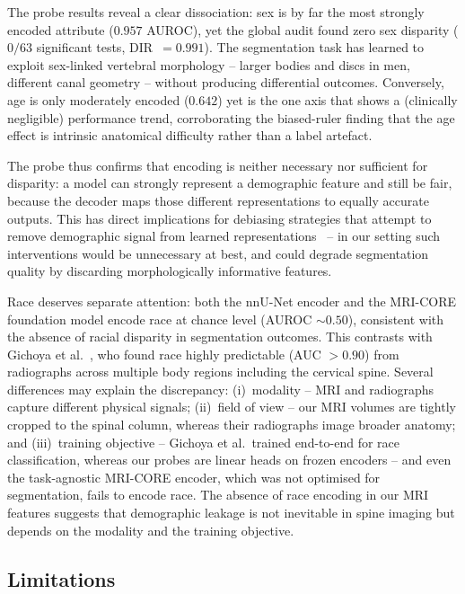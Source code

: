 The probe results reveal a clear dissociation: sex is by far the most strongly
encoded attribute ($0.957$ AUROC), yet the global audit found zero sex disparity
($0/63$ significant tests, DIR~$= 0.991$). The segmentation task has learned to
exploit sex-linked vertebral morphology -- larger bodies and discs in men,
different canal geometry -- without producing differential outcomes. Conversely,
age is only moderately encoded ($0.642$) yet is the one axis that shows a
(clinically negligible) performance trend, corroborating the biased-ruler finding
that the age effect is intrinsic anatomical difficulty rather than a label
artefact.

The probe thus confirms that encoding is neither necessary nor sufficient for
disparity: a model can strongly represent a demographic feature and still be fair,
because the decoder maps those different representations to equally accurate
outputs. This has direct implications for debiasing strategies that attempt to
remove demographic signal from learned representations~\cite{petersen2023feature}
-- in our setting such interventions would be unnecessary at best, and could
degrade segmentation quality by discarding morphologically informative features.

Race deserves separate attention: both the nnU-Net encoder and the MRI-CORE
foundation model encode race at chance level (AUROC ${\sim}0.50$), consistent
with the absence of racial disparity in segmentation outcomes. This contrasts
with Gichoya et al.~\cite{gichoya2022reading}, who found race highly predictable
(AUC $>0.90$) from radiographs across multiple body regions including the
cervical spine. Several differences may
explain the discrepancy: (i)~modality -- MRI and radiographs capture different
physical signals; (ii)~field of view -- our MRI volumes are tightly cropped to
the spinal column, whereas their radiographs image broader anatomy; and (iii)~training
objective -- Gichoya et al.\ trained end-to-end for race classification, whereas
our probes are linear heads on frozen encoders -- and even the task-agnostic
MRI-CORE encoder, which was not optimised for segmentation, fails to encode race.
The absence of race encoding in our MRI features
suggests that demographic leakage is not inevitable in spine imaging but depends
on the modality and the training objective.

\subsection{Limitations}
\label{sec:limitations}

